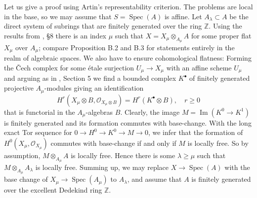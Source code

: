 \documentclass[oneside, 12pt]{amsart}
\theoremstyle{definition}
\theoremstyle{remark}
\newcommand{\ZZ}{\mathbb{Z}}
\newcommand{\Image}{\operatorname{Im}}
\renewcommand{\O}{\mathscr{O}}
\newcommand{\ra}{\rightarrow}
\newcommand{\Spec}{\operatorname{Spec}}
\begin{document}
\proof
Let us give a proof using Artin's representability criterion.
The problems are local in the base, so we may assume that $S=\Spec(A)$ is affine. 
Let $A_\lambda\subset A$ be the direct system of subrings that are finitely generated over the ring $\ZZ$.
Using the results from \cite{EGA IVc}, \S 8 there is an index $\mu$
such that $X=X_\mu\otimes_{A_\mu}A$ for some proper flat $X_\mu$ over $A_\mu$;
compare \cite{Rydh 2015} Proposition B.2 and B.3 for statements entirely in the realm of algebraic spaces.
We also have to ensure cohomological flatness:
Forming the \v{C}ech complex for some \'etale surjection $U_\mu\ra X_\mu$ with an  affine scheme $U_\mu$
and arguing as in \cite{Mumford 1970}, Section 5 we find a bounded complex $K^\bullet$ of
finitely generated projective $A_\mu$-modules giving an identification
$$
H^r(X_\mu\otimes B,\O_{X_\mu\otimes B}) = H^r(K^\bullet\otimes B),\quad r\geq 0
$$
that is functorial in the  $A_\mu$-algebras $B$. Clearly, the image  $M=\Image(K^0\ra K^1)$ is finitely generated
and its formation commutes with base-change. With the long exact Tor sequence for $0\ra H^0\ra K^0\ra M\ra 0$, we infer that the formation
of $H^0(X_\mu,\O_{X_\mu})$ commutes with base-change if and only if $M$ is locally free.
So by assumption, $M\otimes_{A_\mu} A$ is locally free. Hence there is some $\lambda\geq \mu$
such that $M\otimes_{A_\mu} A_\lambda$ is locally free.
Summing up, we may replace $X\ra \Spec(A)$ with the base change of $X_\mu\ra\Spec(A_\mu)$
to $A_\lambda$, and assume that $A$ is finitely generated over the excellent Dedekind ring $\ZZ$.
\end{document}

